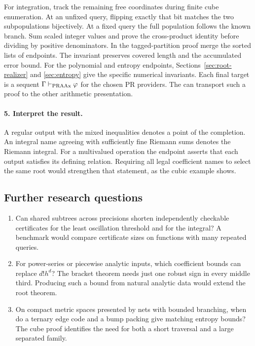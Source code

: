 For integration, track the remaining free coordinates during finite cube enumeration. At an unfixed query, flipping exactly that bit matches the two subpopulations bijectively. At a fixed query the full population follows the known branch. Sum scaled integer values and prove the cross-product identity before dividing by positive denominators. In the tagged-partition proof merge the sorted lists of endpoints. The invariant preserves covered length and the accumulated error bound. For the polynomial and entropy endpoints, Sections~\ref{sec:root-realizer} and \ref{sec:entropy} give the specific numerical invariants. Each final target is a sequent $\Gamma\vdash_{\rm PRAAx}\varphi$ for the chosen PR providers. The  can transport such a proof to the other arithmetic presentation.

\paragraph{5. Interpret the result.}
A regular output with the mixed inequalities denotes a point of the completion. An integral name agreeing with sufficiently fine Riemann sums denotes the Riemann integral. For a multivalued operation the endpoint asserts that each output satisfies its defining relation. Requiring all legal coefficient names to select the same root would strengthen that statement, as the cubic example shows.

\subsection{Further research questions}
\begin{enumerate}[leftmargin=22pt]
\item Can shared subtrees across precisions shorten independently checkable certificates for the least oscillation threshold and for the integral? A benchmark would compare certificate sizes on functions with many repeated queries.
\item For power-series or piecewise analytic inputs, which coefficient bounds can replace $d!h^d$? The bracket theorem needs just one robust sign in every middle third. Producing such a bound from natural analytic data would extend the root theorem.
\item On compact metric spaces presented by nets with bounded branching, when do a ternary edge code and a bump packing give matching entropy bounds? The cube proof identifies the need for both a short traversal and a large separated family.
\end{enumerate}

